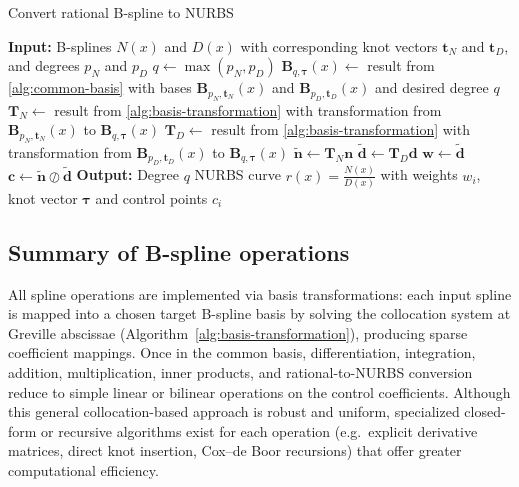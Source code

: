 \begin{algorithm}
    \caption{Convert rational B-spline to NURBS}\label{alg:nurbs-conversion}
    \begin{algorithmic}[1]
        \State \textbf{Input:} B-splines $N(x)$ and $D(x)$ with corresponding knot vectors $\mathbf t_N$ and $\mathbf t_D$, and degrees $p_N$ and $p_D$
        \State $q \gets \max(p_N, p_D)$
        \State $\mathbf B_{q,\boldsymbol{\tau}}(x) \gets $ result from \cref{alg:common-basis} with bases $\mathbf B_{p_N,\mathbf t_N}(x)$ and $\mathbf B_{p_D,\mathbf t_D}(x)$ and desired degree $q$
        \State $\mathbf T_N \gets $ result from \cref{alg:basis-transformation} with transformation from $\mathbf B_{p_N,\mathbf t_N}(x)$ to $\mathbf B_{q,\boldsymbol{\tau}}(x)$
        \State $\mathbf T_D \gets $ result from \cref{alg:basis-transformation} with transformation from $\mathbf B_{p_D,\mathbf t_D}(x)$ to $\mathbf B_{q,\boldsymbol{\tau}}(x)$
        \State $\mathbf{\tilde n} \gets \mathbf T_N \mathbf n$
        \State $\mathbf{\tilde d} \gets \mathbf T_D \mathbf d$
        \State $\mathbf w \gets \mathbf{\tilde d}$
        \State $\mathbf c \gets \mathbf{\tilde n} \oslash \mathbf{\tilde d}$ 
        \State \textbf{Output:} Degree $q$ NURBS curve $\displaystyle r(x) = \frac{N(x)}{D(x)}$ with weights $w_i$, knot vector $\boldsymbol{\tau}$ and control points $c_i$
    \end{algorithmic}
\end{algorithm}


\subsection{Summary of B-spline operations}\label{sec:summary-b-spline-operations}
All spline operations are implemented via basis transformations: each input spline is mapped into a chosen target B-spline basis by solving the collocation system at Greville abscissae (Algorithm~\ref{alg:basis-transformation}), producing sparse coefficient mappings. Once in the common basis, differentiation, integration, addition, multiplication, inner products, and rational-to-NURBS conversion reduce to simple linear or bilinear operations on the control coefficients. Although this general collocation-based approach is robust and uniform, specialized closed-form or recursive algorithms exist for each operation (e.g.\ explicit derivative matrices, direct knot insertion, Cox–de Boor recursions) that offer greater computational efficiency.


